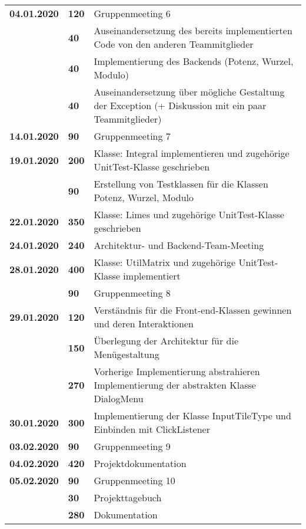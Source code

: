 {\begin{longtable}{|l|l|p{11cm}|}
		\\ \hline \textbf{04.01.2020}
		& \textbf{\hfill 120} & Gruppenmeeting 6 \\\cline{2-3}
		& \textbf{\hfill 40} & Auseinandersetzung des bereits implementierten Code von den anderen Teammitglieder \\\cline{2-3}
		& \textbf{\hfill 40} & Implementierung des Backends (Potenz, Wurzel, Modulo)\\\cline{2-3}
		& \textbf{\hfill 40} & Auseinandersetzung über mögliche Gestaltung der Exception
		(+ Diskussion mit ein paar Teammitglieder)
		\\ \hline \textbf{14.01.2020}
		& \textbf{\hfill 90} & Gruppenmeeting 7
		\\ \hline \textbf{19.01.2020}
		& \textbf{\hfill 200} & Klasse: Integral implementieren und zugehörige UnitTest-Klasse geschrieben \\\cline{2-3}
		& \textbf{\hfill 90} & Erstellung von Testklassen für die Klassen Potenz, Wurzel, Modulo
		\\ \hline \textbf{22.01.2020}
		& \textbf{\hfill 350} & Klasse: Limes und zugehörige UnitTest-Klasse geschrieben
		\\ \hline \textbf{24.01.2020}
		& \textbf{\hfill 240} & Architektur- und Backend-Team-Meeting 
		\\ \hline \textbf{28.01.2020}
		& \textbf{\hfill 400} & Klasse: UtilMatrix und zugehörige UnitTest-Klasse implementiert \\\cline{2-3}
		& \textbf{\hfill 90} & Gruppenmeeting 8
		\\ \hline \textbf{29.01.2020}
		& \textbf{\hfill 120} & Verständnis für die Front-end-Klassen gewinnen und deren Interaktionen \\\cline{2-3}
		& \textbf{\hfill 150} & Überlegung der Architektur für die Menügestaltung  \\\cline{2-3}
		& \textbf{\hfill 270} & Vorherige Implementierung abstrahieren		Implementierung der abstrakten Klasse DialogMenu
		\\ \hline \textbf{30.01.2020}
		& \textbf{\hfill 300} & Implementierung der Klasse InputTileType und Einbinden mit ClickListener
		\\ \hline \textbf{03.02.2020}
		& \textbf{\hfill 90} & Gruppenmeeting 9
		\\ \hline \textbf{04.02.2020}
		& \textbf{\hfill 420} & Projektdokumentation
		\\ \hline \textbf{05.02.2020}
		& \textbf{\hfill 90} & Gruppenmeeting 10 \\\cline{2-3}
		& \textbf{\hfill 30} & Projekttagebuch \\\cline{2-3}
		& \textbf{\hfill 280} & Dokumentation  
		\\ \hline
	\end{longtable}
}

